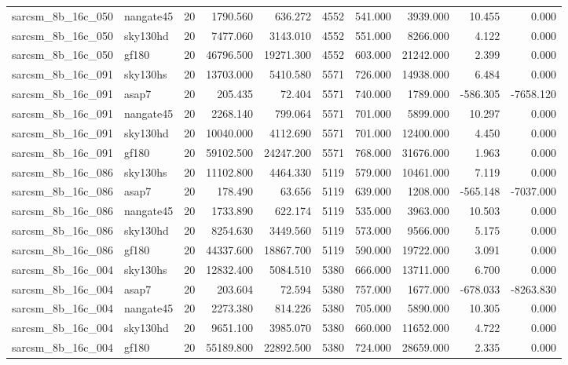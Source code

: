 \begin{longtable}{llrrrrrrrr}
sarcsm\_8b\_16c\_050 & nangate45 & 20 & 1790.560 & 636.272 & 4552 & 541.000 & 3939.000 & 10.455 & 0.000 \\
sarcsm\_8b\_16c\_050 & sky130hd & 20 & 7477.060 & 3143.010 & 4552 & 551.000 & 8266.000 & 4.122 & 0.000 \\
sarcsm\_8b\_16c\_050 & gf180 & 20 & 46796.500 & 19271.300 & 4552 & 603.000 & 21242.000 & 2.399 & 0.000 \\
sarcsm\_8b\_16c\_091 & sky130hs & 20 & 13703.000 & 5410.580 & 5571 & 726.000 & 14938.000 & 6.484 & 0.000 \\
sarcsm\_8b\_16c\_091 & asap7 & 20 & 205.435 & 72.404 & 5571 & 740.000 & 1789.000 & -586.305 & -7658.120 \\
sarcsm\_8b\_16c\_091 & nangate45 & 20 & 2268.140 & 799.064 & 5571 & 701.000 & 5899.000 & 10.297 & 0.000 \\
sarcsm\_8b\_16c\_091 & sky130hd & 20 & 10040.000 & 4112.690 & 5571 & 701.000 & 12400.000 & 4.450 & 0.000 \\
sarcsm\_8b\_16c\_091 & gf180 & 20 & 59102.500 & 24247.200 & 5571 & 768.000 & 31676.000 & 1.963 & 0.000 \\
sarcsm\_8b\_16c\_086 & sky130hs & 20 & 11102.800 & 4464.330 & 5119 & 579.000 & 10461.000 & 7.119 & 0.000 \\
sarcsm\_8b\_16c\_086 & asap7 & 20 & 178.490 & 63.656 & 5119 & 639.000 & 1208.000 & -565.148 & -7037.000 \\
sarcsm\_8b\_16c\_086 & nangate45 & 20 & 1733.890 & 622.174 & 5119 & 535.000 & 3963.000 & 10.503 & 0.000 \\
sarcsm\_8b\_16c\_086 & sky130hd & 20 & 8254.630 & 3449.560 & 5119 & 573.000 & 9566.000 & 5.175 & 0.000 \\
sarcsm\_8b\_16c\_086 & gf180 & 20 & 44337.600 & 18867.700 & 5119 & 590.000 & 19722.000 & 3.091 & 0.000 \\
sarcsm\_8b\_16c\_004 & sky130hs & 20 & 12832.400 & 5084.510 & 5380 & 666.000 & 13711.000 & 6.700 & 0.000 \\
sarcsm\_8b\_16c\_004 & asap7 & 20 & 203.604 & 72.594 & 5380 & 757.000 & 1677.000 & -678.033 & -8263.830 \\
sarcsm\_8b\_16c\_004 & nangate45 & 20 & 2273.380 & 814.226 & 5380 & 705.000 & 5890.000 & 10.305 & 0.000 \\
sarcsm\_8b\_16c\_004 & sky130hd & 20 & 9651.100 & 3985.070 & 5380 & 660.000 & 11652.000 & 4.722 & 0.000 \\
sarcsm\_8b\_16c\_004 & gf180 & 20 & 55189.800 & 22892.500 & 5380 & 724.000 & 28659.000 & 2.335 & 0.000 \\

\end{longtable}
